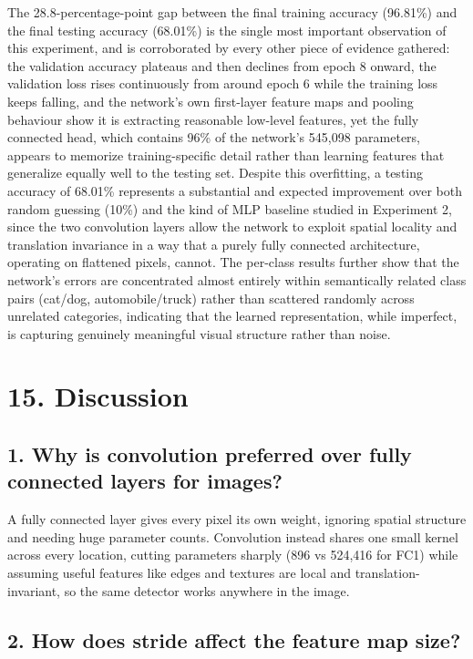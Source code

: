 \documentclass[11pt,a4paper]{article}
\begin{document}
The 28.8-percentage-point gap between the final training accuracy (96.81\%) and the final testing accuracy (68.01\%) is the single most important observation of this experiment, and is corroborated by every other piece of evidence gathered: the validation accuracy plateaus and then declines from epoch 8 onward, the validation loss rises continuously from around epoch 6 while the training loss keeps falling, and the network's own first-layer feature maps and pooling behaviour show it is extracting reasonable low-level features, yet the fully connected head, which contains 96\% of the network's 545{,}098 parameters, appears to memorize training-specific detail rather than learning features that generalize equally well to the testing set. Despite this overfitting, a testing accuracy of 68.01\% represents a substantial and expected improvement over both random guessing (10\%) and the kind of MLP baseline studied in Experiment 2, since the two convolution layers allow the network to exploit spatial locality and translation invariance in a way that a purely fully connected architecture, operating on flattened pixels, cannot. The per-class results further show that the network's errors are concentrated almost entirely within semantically related class pairs (cat/dog, automobile/truck) rather than scattered randomly across unrelated categories, indicating that the learned representation, while imperfect, is capturing genuinely meaningful visual structure rather than noise.

\section*{15. Discussion}
 
\subsection*{1. Why is convolution preferred over fully connected layers for images?}
 
A fully connected layer gives every pixel its own weight, ignoring spatial structure and needing huge parameter counts. Convolution instead shares one small kernel across every location, cutting parameters sharply (896 vs 524{,}416 for FC1) while assuming useful features like edges and textures are local and translation-invariant, so the same detector works anywhere in the image.
 
\subsection*{2. How does stride affect the feature map size?}
 
\end{document}
